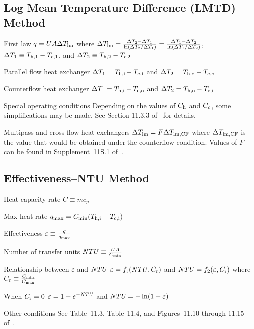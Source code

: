 \documentclass{article}
\begin{document}
\subsection{Log Mean Temperature Difference (LMTD) Method}
\label{sec:lmtd}

\begin{description*}
\item[First law]
  \(q = UA\Delta T_{\mathrm{lm}}\) where
  \(\Delta T_{\mathrm{lm}} = \frac{\Delta T_2 - \Delta T_1}{\ln(\Delta T_2 / \Delta T_1)}
  = \frac{\Delta T_1 - \Delta T_2}{\ln(\Delta T_1 / \Delta T_2)}\),
  \(\Delta T_1 \equiv T_{\mathrm{h},1} - T_{\mathrm{c},1}\), and
  \(\Delta T_2 \equiv T_{\mathrm{h},2} - T_{\mathrm{c},2}\)
\item[Parallel flow heat exchanger]
  \(\Delta T_1 = T_{\mathrm{h,i}} - T_{\mathrm{c,i}}\) and
  \(\Delta T_2 = T_{\mathrm{h,o}} - T_{\mathrm{c,o}}\)
\item[Counterflow heat exchanger]
  \(\Delta T_1 = T_{\mathrm{h,i}} - T_{\mathrm{c,o}}\) and
  \(\Delta T_2 = T_{\mathrm{h,o}} - T_{\mathrm{c,i}}\)
\item[Special operating conditions] Depending on the values of $C_{\mathrm{h}}$ and $C_{\mathrm{c}}$,
  some simplifications may be made. See Section 11.3.3 of~\cite{hamt} for details.
\item[Multipass and cross-flow heat exchangers]
  \(\Delta T_{\mathrm{lm}} = F \Delta T_{\mathrm{lm,CF}}\) where $\Delta T_{\mathrm{lm,CF}}$ is the value
  that would be obtained under the counterflow condition. Values of $F$ can be found in
  Supplement~11S.1 of~\cite{hamt}.
\end{description*}

\subsection{Effectiveness--NTU Method}
\label{sec:eff-ntu}

\begin{description*}
\item[Heat capacity rate]
  \(C \equiv \dot{m} c_p\)
\item[Max heat rate]
  \(q_{\mathrm{max}} = C_{\mathrm{min}}(T_{\mathrm{h,i}} - T_{\mathrm{c,i}})\)
\item[Effectiveness]
  \(\varepsilon \equiv \frac{q}{q_{\mathrm{max}}}\)
\item[Number of transfer units]
  \(\mathord{\mathit{NTU}} \equiv \frac{UA}{C_{\mathrm{min}}}\)
\item[Relationship between $\varepsilon$ and $\mathord{\mathit{NTU}}$]
  \(\varepsilon = f_1(\mathord{\mathit{NTU}}, C_{\mathrm{r}})\) and
  \(\mathord{\mathit{NTU}} = f_2(\varepsilon, C_{\mathrm{r}})\) where
  \(C_{\mathrm{r}} \equiv \frac{C_{\mathrm{min}}}{C_{\mathrm{max}}}\)
  \begin{description*}
  \item[When \(C_{\mathrm{r}} = 0\)]
    \(\varepsilon = 1 - e^{-\mathord{\mathit{NTU}}}\) and \(\mathord{\mathit{NTU}} = -\ln(1 - \varepsilon)\)
  \item[Other conditions] See Table~11.3, Table~11.4, and Figures~11.10 through 11.15 of~\cite{hamt}.
  \end{description*}
\end{description*}
\end{document}
